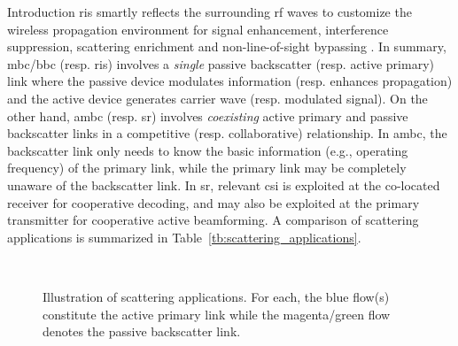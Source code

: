 \documentclass[journal,12pt,onecolumn,draftclsnofoot]{IEEEtran}
\theoremstyle{remark}
\begin{document}
\begin{section}{Introduction}
	\gls{ris} smartly reflects the surrounding \gls{rf} waves to customize the wireless propagation environment for signal enhancement, interference suppression, scattering enrichment and non-line-of-sight bypassing \cite{Wu2021b}.
	In summary, \gls{mbc}/\gls{bbc} (resp. \gls{ris}) involves a \emph{single} passive backscatter (resp. active primary) link where the passive device modulates information (resp. enhances propagation) and the active device generates carrier wave (resp. modulated signal).
	On the other hand, \gls{ambc} (resp. \gls{sr}) involves \emph{coexisting} active primary and passive backscatter links in a competitive (resp. collaborative) relationship.
	In \gls{ambc}, the backscatter link only needs to know the basic information (e.g., operating frequency) of the primary link, while the primary link may be completely unaware of the backscatter link.
	In \gls{sr}, relevant \gls{csi} is exploited at the co-located receiver for cooperative decoding, and may also be exploited at the primary transmitter for cooperative active beamforming.
	A comparison of scattering applications is summarized in Table~\ref{tb:scattering_applications}.

	\begin{figure}[!t]
		\centering
		\\
		\subfloat[\gls{sr}]{
			\resizebox{0.25\linewidth}{!}{
				
			}
			\label{fg:sr}
		}
		\subfloat[RIScatter]{
			\resizebox{0.25\linewidth}{!}{
				
			}
			\label{fg:riscatter}
		}
		\caption{
			Illustration of scattering applications.
			For each, the blue flow(s) constitute the active primary link while the magenta/green flow denotes the passive backscatter link.
		}
		\label{fg:scatter_illustration}
	\end{figure}


\end{section}
\end{document}
